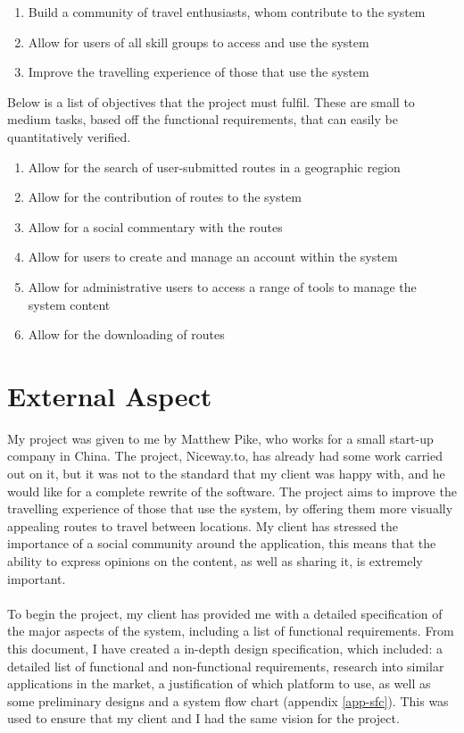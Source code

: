 \documentclass[a4paper,twoside,notitlepage,11pt]{article}
\begin{document}
\begin{enumerate}
	\item Build a community of travel enthusiasts, whom contribute to the system
	\item Allow for users of all skill groups to access and use the system
	\item Improve the travelling experience of those that use the system
\end{enumerate}
\noindent
Below is a list of objectives that the project must fulfil. These are small to medium tasks, based off the functional requirements, that can easily be quantitatively verified.

\begin{enumerate}
	\item Allow for the search of user-submitted routes in a geographic region
	\item Allow for the contribution of routes to the system
	\item Allow for a social commentary with the routes
	\item Allow for users to create and manage an account within the system
	\item Allow for administrative users to access a range of tools to manage the system content
	\item Allow for the downloading of routes
\end{enumerate}

\section{External Aspect}
My project was given to me by Matthew Pike, who works for a small start-up company in China. The project, Niceway.to, has already had some work carried out on it, but it was not to the standard that my client was happy with, and he would like for a complete rewrite of the software. The project aims to improve the travelling experience of those that use the system, by offering them more visually appealing routes to travel between locations. My client has stressed the importance of a social community around the application, this means that the ability to express opinions on the content, as well as sharing it, is extremely important.\ \\
\ \\
To begin the project, my client has provided me with a detailed specification of the major aspects of the system, including a list of functional requirements. From this document, I have created a in-depth design specification, which included: a detailed list of functional and non-functional requirements, research into similar applications in the market, a justification of which platform to use, as well as some preliminary designs and a system flow chart (appendix \ref{app-sfc}). This was used to ensure that my client and I had the same vision for the project.\ \\
\end{document}
